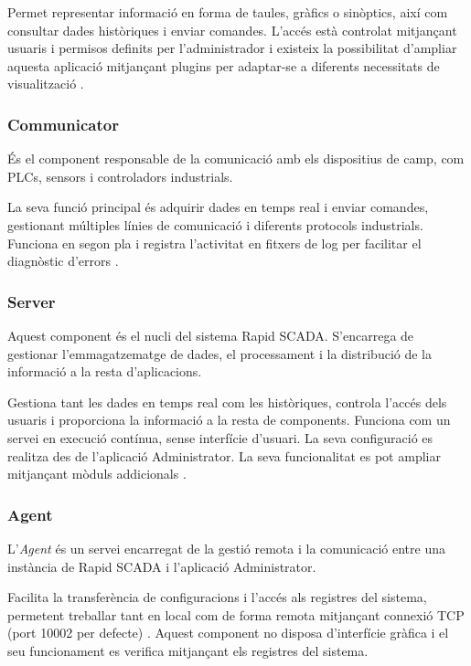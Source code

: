 \documentclass[a4paper,11pt,DIV=13,headings=normal,abstract=true,twoside=semi]{article}
\begin{document}
Permet representar informació en forma de taules, gràfics o sinòptics, així com consultar dades històriques i enviar comandes. L'accés està controlat mitjançant usuaris i permisos definits per l'administrador i existeix la possibilitat d'ampliar aquesta aplicació mitjançant plugins per adaptar-se a diferents necessitats de visualització \cite{rapidscada_apps}.


\subsubsection*{Communicator}

És el component responsable de la comunicació amb els dispositius de camp, com PLCs, sensors i controladors industrials.

La seva funció principal és adquirir dades en temps real i enviar comandes, gestionant múltiples línies de comunicació i diferents protocols industrials. Funciona en segon pla i registra l'activitat en fitxers de log per facilitar el diagnòstic d'errors \cite{rapidscada_apps}.

\subsubsection*{Server}

Aquest component és el nucli del sistema Rapid SCADA. S'encarrega de gestionar l'emmagatzematge de dades, el processament i la distribució de la informació a la resta d'aplicacions.

Gestiona tant les dades en temps real com les històriques, controla l'accés dels usuaris i proporciona la informació a la resta de components. Funciona com un servei en execució contínua, sense interfície d'usuari. La seva configuració es realitza des de l'aplicació Administrator. La seva funcionalitat es pot ampliar mitjançant mòduls addicionals \cite{rapidscada_apps}.


\subsubsection*{Agent}

L'\textit{Agent} és un servei encarregat de la gestió remota i la comunicació entre una instància de Rapid SCADA i l'aplicació Administrator.

Facilita la transferència de configuracions i l'accés als registres del sistema, permetent treballar tant en local com de forma remota mitjançant connexió TCP (port 10002 per defecte) \cite{rapidscada_apps}. Aquest component no disposa d'interfície gràfica i el seu funcionament es verifica mitjançant els registres del sistema.
\end{document}
